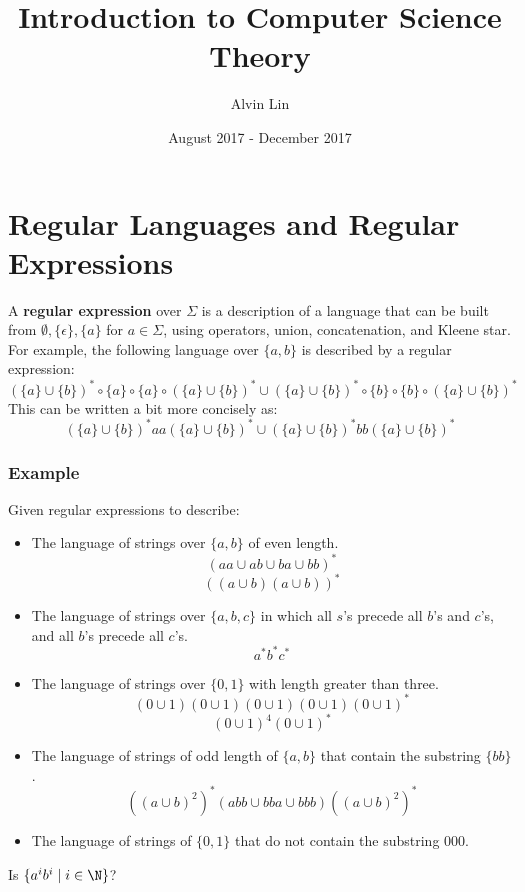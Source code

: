 \documentclass{math}
\title{Introduction to Computer Science Theory}
\author{Alvin Lin}
\date{August 2017 - December 2017}
\begin{document}
\maketitle

\section*{Regular Languages and Regular Expressions}
A \textbf{regular expression} over \( \Sigma \) is a description of a language
that can be built from \( \emptyset,\{\epsilon\},\{a\} \) for \( a\in\Sigma \),
using operators, union, concatenation, and Kleene star. For example, the
following language over \( \{a,b\} \) is described by a regular expression:
\[ (\{a\}\cup\{b\})^*\circ\{a\}\circ\{a\}\circ(\{a\}\cup\{b\})^*\cup
  (\{a\}\cup\{b\})^*\circ\{b\}\circ\{b\}\circ(\{a\}\cup\{b\})^* \]
This can be written a bit more concisely as:
\[ (\{a\}\cup\{b\})^*aa(\{a\}\cup\{b\})^*\cup
  (\{a\}\cup\{b\})^*bb(\{a\}\cup\{b\})^* \]

\subsubsection*{Example}
Given regular expressions to describe:
\begin{itemize}
  \item The language of strings over \( \{a,b\} \) of even length.
  \[ (aa\cup ab\cup ba\cup bb)^* \]
  \[ ((a\cup b)(a\cup b))^* \]
  \item The language of strings over \( \{a,b,c\} \) in which all \( s \)'s
  precede all \( b \)'s and \( c \)'s, and all \( b \)'s precede all \( c \)'s.
  \[ a^*b^*c^* \]
  \item The language of strings over \( \{0,1\} \) with length greater than
  three.
  \[ (0\cup1)(0\cup1)(0\cup1)(0\cup1)(0\cup1)^* \]
  \[ (0\cup1)^4(0\cup1)^* \]
  \item The language of strings of odd length of \( \{a,b\} \) that contain
  the substring \( \{ bb \} \).
  \[ ((a\cup b)^2)^*(abb\cup bba \cup bbb)((a\cup b)^2)^* \]
  \item The language of strings of \( \{0,1\} \) that do not contain the
  substring \( 000 \).
\end{itemize}
Is \( \{a^ib^i \mid i\in\N \} \)?
\end{document}
